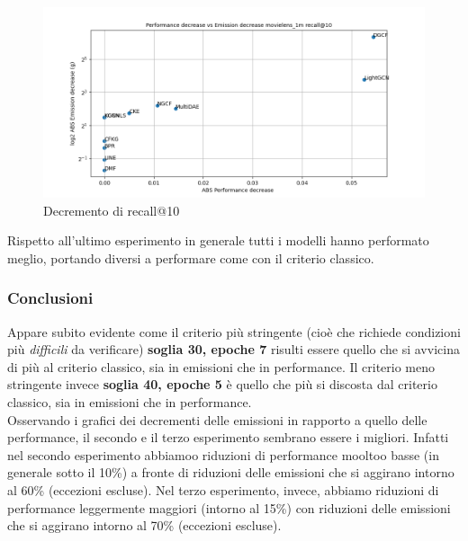 \begin{figure}[H]
    \centering
     \includegraphics[width=\textwidth]{images/decrement_recall@10_movielens_1m_30_7.png}
    \caption{Decremento di recall@10}
\end{figure}

\noindent Rispetto all'ultimo esperimento in generale tutti i modelli hanno performato meglio, portando diversi a performare come con il criterio classico.



\subsubsection{Conclusioni}

Appare subito evidente come il criterio più stringente (cioè che richiede condizioni più \textit{difficili} da verificare) \textbf{soglia 30, epoche 7} risulti essere quello che si avvicina di più al criterio classico, sia in emissioni che in performance. Il criterio meno stringente invece \textbf{soglia 40, epoche 5} è quello che più si discosta dal criterio classico, sia in emissioni che in performance.\\

\noindent Osservando i grafici dei decrementi delle emissioni in rapporto a quello delle performance, il secondo e il terzo esperimento sembrano essere i migliori.
Infatti nel secondo esperimento abbiamoo riduzioni di performance mooltoo basse (in generale sotto il 10\%) a fronte di riduzioni delle emissioni che si aggirano intorno al 60\% (eccezioni escluse).
Nel terzo esperimento, invece, abbiamo riduzioni di performance leggermente maggiori (intorno al 15\%) con riduzioni delle emissioni che si aggirano intorno al 70\% (eccezioni escluse).\\

